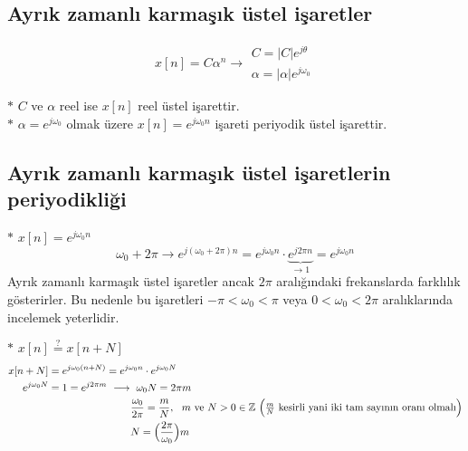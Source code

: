 \documentclass[11pt,a4paper]{article}
\begin{document}
\subsection{Ayrık zamanlı karmaşık üstel işaretler}
\noindent
\begin{minipage}[c]{0.65\linewidth}
  \[
    x[n]=C\alpha^n\longrightarrow
    \begin{array}{l}
      C=|C|e^{j\theta}\\
      \alpha=|\alpha|e^{j\omega_0}
    \end{array}
  \]
\end{minipage}\hfill
\begin{minipage}[c]{0.3\linewidth}
  \centering
  {\color{kirmizikalem}}
\end{minipage}

$*$ $C$ ve $\alpha$ reel ise $x[n]$ reel üstel işarettir.\\
$*$ $\alpha=e^{j\omega_0}$ olmak üzere $x[n]=e^{j\omega_0n}$ işareti periyodik üstel işarettir.

\subsection{Ayrık zamanlı karmaşık üstel işaretlerin periyodikliği}
$*$ $x[n]=e^{j\omega_0n}$
\[
  \omega_0+2\pi\longrightarrow e^{j(\omega_0+2\pi)n}=e^{j\omega_0n}\cdot\underbrace{e^{j2\pi n}}_{\to1}=e^{j\omega_0n}
\]
Ayrık zamanlı karmaşık üstel işaretler ancak $2\pi$ aralığındaki frekanslarda farklılık gösterirler.
Bu nedenle bu işaretleri $-\pi<\omega_0<\pi$ veya $0<\omega_0<2\pi$ aralıklarında incelemek yeterlidir.

\medskip
$*$ $x[n]\overset{?}{=}x[n+N]$
\begin{align*}
  x[n+N]&=e^{j\omega_0(n+N)}=e^{j\omega_0n}\cdot e^{j\omega_0N}\\
  e^{j\omega_0N}&=1=e^{j2\pi m}\ \longrightarrow\ \omega_0N=2\pi m\\
  &\phantom{=1=e^{j2\pi m}\ \longrightarrow\ }\frac{\omega_0}{2\pi}=\frac{m}{N},\ \ m \text{ ve } N>0\in\mathbb{Z}
    \ \Bigl(\tfrac{m}{N} \text{ kesirli yani iki tam sayının oranı olmalı}\Bigr)\\
  &\phantom{=1=e^{j2\pi m}\ \longrightarrow\ }N=\Bigl(\frac{2\pi}{\omega_0}\Bigr)m
\end{align*}
\end{document}
